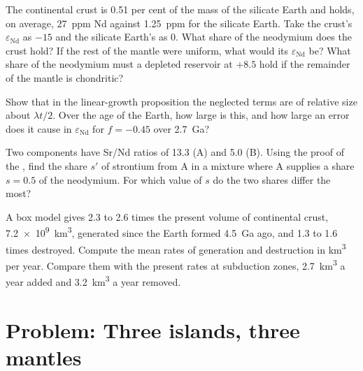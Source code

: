 \begin{exercise}[$\star\star$]\label{exo:b2:isotope-geochemistry:9}
The continental crust is 0.51 per cent of the mass of the silicate Earth and holds,
on average, \qty{27}{ppm} Nd against \qty{1.25}{ppm} for the silicate Earth. Take
the crust's $\varepsilon_{\mathrm{Nd}}$ as $-15$ and the silicate Earth's as 0. What
share of the neodymium does the crust hold? If the rest of the mantle were uniform,
what would its $\varepsilon_{\mathrm{Nd}}$ be? What share of the neodymium must a
depleted reservoir at $+8.5$ hold if the remainder of the mantle is chondritic?
\end{exercise}

\begin{exercise}[$\star\star\star$]\label{exo:b2:isotope-geochemistry:10}
Show that in the linear-growth proposition the neglected terms are of relative
size about $\lambda t/2$. Over the age of the Earth, how large is this, and how
large an error does it cause in $\varepsilon_{\mathrm{Nd}}$ for $f = -0.45$ over
\qty{2.7}{Ga}?
\end{exercise}

\begin{exercise}[$\star\star\star$]\label{exo:b2:isotope-geochemistry:11}
Two components have Sr/Nd ratios of 13.3 (A) and 5.0 (B). Using the proof of the
, find the share $s'$ of strontium from A in a mixture where A
supplies a share $s = 0.5$ of the neodymium. For which value of $s$ do the two
shares differ the most?
\end{exercise}

\begin{exercise}[$\star\star\star$]\label{exo:b2:isotope-geochemistry:12}
A box model gives 2.3 to 2.6 times the present volume of continental crust,
\qty{7.2e9}{km^3}, generated since the Earth formed \qty{4.5}{Ga} ago, and 1.3 to 1.6
times destroyed. Compute the mean rates of generation and destruction in
\unit{km^3} per year. Compare them with the present rates at subduction zones,
\qty{2.7}{km^3} a year added and \qty{3.2}{km^3} a year removed.
\end{exercise}

\section{Problem: Three islands, three mantles}

